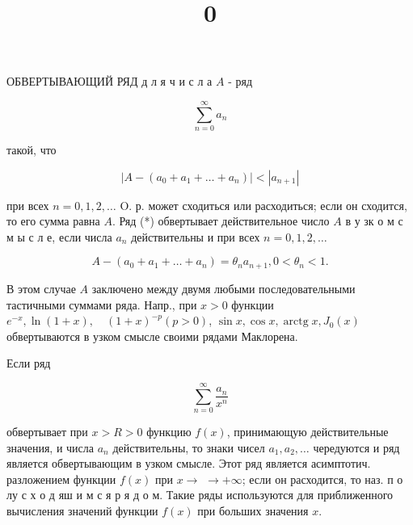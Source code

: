\documentclass[10pt]{article}
\title{$\mathbf{0}$ }
\author{}
\date{}
\begin{document}
\maketitle

ОБВЕРТЫВАЮЩИЙ РЯД д л я ч и с л а $A$ - ряд



\[

\sum_{n=0}^{\infty} a_{n}

\]



такой, что



\[

\left|A-\left(a_{0}+a_{1}+\ldots+a_{n}\right)\right|<\left|a_{n+1}\right|

\]



при всех $n=0,1,2, \ldots$ O. р. может сходиться или расходиться; если он сходится, то его сумма равна $A$. Ряд (*) обвертывает действительное число $A$ в у зк о м с м ы с л е, если числа $a_{n}$ действительны и при всех $n=0,1,2, \ldots$



\[

A-\left(a_{0}+a_{1}+\ldots+a_{n}\right)=\theta_{n} a_{n+1}, 0<\theta_{n}<1 .

\]



В этом случае $A$ заключено между двумя любыми последовательными тастичными суммами ряда. Напр., при $x>0$ функции $e^{-x}, \ln (1+x), \quad(1+x)^{-p}(p>0)$, $\sin x, \cos x, \operatorname{arctg} x, J_{0}(x)$ обвертываются в узком смысле своими рядами Маклорена.



Если ряд



\[

\sum_{n=0}^{\infty} \frac{a_{n}}{x^{n}}

\]



обвертывает при $x>R>0$ функцию $f(x)$, принимающую действительные значения, и числа $a_{n}$ действительны, то знаки чисел $a_{1}, a_{2}, \ldots$ чередуются и ряд является обвертывающим в узком смысле. Этот ряд является асимптотич. разложением функции $f(x)$ при $x \rightarrow$ $\rightarrow+\infty$; если он расходится, то наз. п о лу с х о д яш и м с я р я д о м. Такие ряды используются для приближенного вычисления значений функции $f(x)$ при больших значения $x$.
\end{document}
